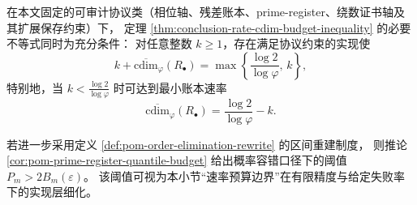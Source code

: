 

\begin{conjecture}[圆维预算前沿的线性最优性]\label{conj:conclusion-circle-dimension-linear-frontier}
在本文固定的可审计协议类（相位轴、残差账本、prime-register、绕数证书轴及其扩展保存约束）下，
定理 \ref{thm:conclusion-rate-cdim-budget-inequality} 的必要不等式同时为充分条件：
对任意整数 \(k\ge 1\)，存在满足协议约束的实现使
\[
k+\overline{\mathrm{cdim}}_{\varphi}(R_\bullet)
=
\max\!\left\{\frac{\log 2}{\log\varphi},\,k\right\},
\]
特别地，当 \(k<\frac{\log 2}{\log\varphi}\) 时可达到最小账本速率
\[
\overline{\mathrm{cdim}}_{\varphi}(R_\bullet)
=
\frac{\log 2}{\log\varphi}-k.
\]
\end{conjecture}

\begin{remark}\label{rem:conclusion-rate-cdim-prime-register-interface}
若进一步采用定义 \ref{def:pom-order-elimination-rewrite} 的区间重建制度，
则推论 \ref{cor:pom-prime-register-quantile-budget} 给出概率容错口径下的阈值
\(
P_m>2B_m(\varepsilon)
\)。
该阈值可视为本小节“速率预算边界”在有限精度与给定失败率下的实现层细化。
\end{remark}
